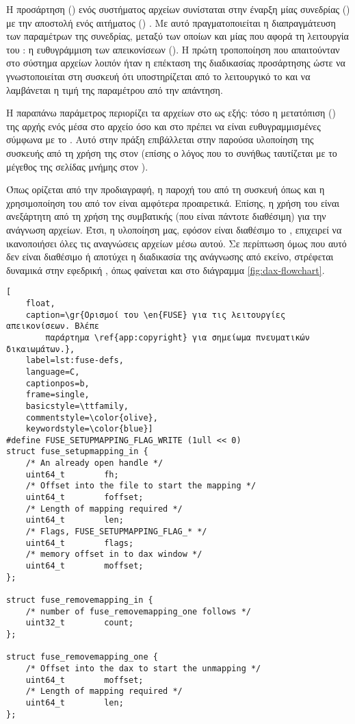Η προσάρτηση () ενός \viofs{} συστήματος αρχείων συνίσταται στην
έναρξη μίας  συνεδρίας () με την αποστολή ενός
 αιτήματος () \cite{virtio}. Με αυτό πραγματοποιείται
η διαπραγμάτευση των παραμέτρων της συνεδρίας, μεταξύ των οποίων και μίας που
αφορά τη λειτουργία του : η ευθυγράμμιση των απεικονίσεων
(). Η πρώτη τροποποίηση που απαιτούνταν στο σύστημα αρχείων
λοιπόν ήταν η επέκταση της διαδικασίας προσάρτησης ώστε να γνωστοποιείται στη
συσκευή ότι υποστηρίζεται από το λειτουργικό το  και να
λαμβάνεται η τιμή της παραμέτρου από την απάντηση.

Η παραπάνω παράμετρος περιορίζει τα  αρχείων στο  ως
εξής: τόσο η μετατόπιση () της αρχής ενός  μέσα στο
αρχείο όσο και στο  πρέπει να είναι ευθυγραμμισμένες σύμφωνα με
το . Αυτό στην πράξη επιβάλλεται στην παρούσα υλοποίηση της
\viofs{} συσκευής από τη χρήση της  \cite{man:mmap} στον \host{}
(επίσης ο λόγος που το  συνήθως ταυτίζεται με το μέγεθος της
σελίδας μνήμης στον \host{}).

Όπως ορίζεται από την προδιαγραφή, η παροχή του  από τη συσκευή
όπως και η χρησιμοποίηση του από τον \guest{} είναι αμφότερα προαιρετικά.
Επίσης, η χρήση του  είναι ανεξάρτητη από τη χρήση της συμβατικής
 (που είναι πάντοτε διαθέσιμη) για την ανάγνωση αρχείων. Έτσι, η
υλοποίηση μας, εφόσον είναι διαθέσιμο το , επιχειρεί να
ικανοποιήσει όλες τις αναγνώσεις αρχείων μέσω αυτού. Σε περίπτωση όμως που αυτό
δεν είναι διαθέσιμο ή αποτύχει η διαδικασία της ανάγνωσης από εκείνο, στρέφεται
δυναμικά στην εφεδρική , όπως φαίνεται και στο διάγραμμα
\ref{fig:dax-flowchart}.

\begin{otherlanguage}{english}
\begin{lstlisting}[
    float,
    caption=\gr{Ορισμοί του \en{FUSE} για τις λειτουργίες απεικονίσεων. Βλέπε
        παράρτημα \ref{app:copyright} για σημείωμα πνευματικών δικαιωμάτων.},
    label=lst:fuse-defs,
    language=C,
    captionpos=b,
    frame=single,
    basicstyle=\ttfamily,
    commentstyle=\color{olive},
    keywordstyle=\color{blue}]
#define FUSE_SETUPMAPPING_FLAG_WRITE (1ull << 0)
struct fuse_setupmapping_in {
    /* An already open handle */
    uint64_t        fh;
    /* Offset into the file to start the mapping */
    uint64_t        foffset;
    /* Length of mapping required */
    uint64_t        len;
    /* Flags, FUSE_SETUPMAPPING_FLAG_* */
    uint64_t        flags;
    /* memory offset in to dax window */
    uint64_t        moffset;
};

struct fuse_removemapping_in {
    /* number of fuse_removemapping_one follows */
    uint32_t        count;
};

struct fuse_removemapping_one {
    /* Offset into the dax to start the unmapping */
    uint64_t        moffset;
    /* Length of mapping required */
    uint64_t        len;
};
\end{lstlisting}
\end{otherlanguage}

